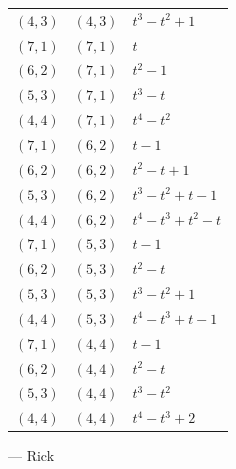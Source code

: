 \documentclass[10pt]{article}
\begin{document}
{\begin{minipage}[t]{0.48\textwidth}
\begin{tabular}{@{}lll@{}}
$(4,3)$ & $(4,3)$ & $t^{3} - t^{2} + 1$ \\
$(7,1)$ & $(7,1)$ & $t$ \\
$(6,2)$ & $(7,1)$ & $t^{2} - 1$ \\
$(5,3)$ & $(7,1)$ & $t^{3} - t$ \\
$(4,4)$ & $(7,1)$ & $t^{4} - t^{2}$ \\
$(7,1)$ & $(6,2)$ & $t - 1$ \\
$(6,2)$ & $(6,2)$ & $t^{2} - t + 1$ \\
$(5,3)$ & $(6,2)$ & $t^{3} - t^{2} + t - 1$ \\
$(4,4)$ & $(6,2)$ & $t^{4} - t^{3} + t^{2} - t$ \\
$(7,1)$ & $(5,3)$ & $t - 1$ \\
$(6,2)$ & $(5,3)$ & $t^{2} - t$ \\
$(5,3)$ & $(5,3)$ & $t^{3} - t^{2} + 1$ \\
$(4,4)$ & $(5,3)$ & $t^{4} - t^{3} + t - 1$ \\
$(7,1)$ & $(4,4)$ & $t - 1$ \\
$(6,2)$ & $(4,4)$ & $t^{2} - t$ \\
$(5,3)$ & $(4,4)$ & $t^{3} - t^{2}$ \\
$(4,4)$ & $(4,4)$ & $t^{4} - t^{3} + 2$ \\
\bottomrule
\end{tabular}
\end{minipage}
}

\medskip
--- Rick
\end{document}
